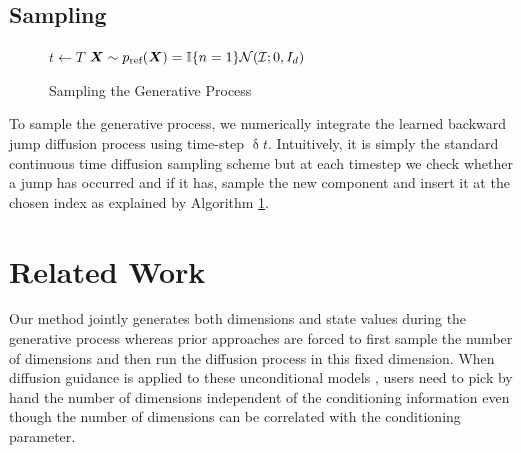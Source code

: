 \subsection{Sampling}

\begin{figure}
    \begin{minipage}[t]{0.6\textwidth}
    \small
        \begin{algorithm}[H]
        \SetAlgoNoLine
        \DontPrintSemicolon
        $t \leftarrow T$\;
        ${\bm{X}} \sim p_{\textup{ref}}({\bm{X}}) = \mathbb{I}\{ n=1\} \mathcal{N}(\mathcal{I}; 0, I_{d})$\;
         \caption{Sampling the Generative Process}
         \label{alg:backwardsampling}
        \end{algorithm}
    \end{minipage}
\end{figure}
To sample the generative process, we numerically integrate the learned backward jump diffusion process using time-step  $\updelta t$. Intuitively, it is simply the standard continuous time diffusion sampling scheme \cite{song2020score} but at each timestep we check whether a jump has occurred and if it has, sample the new component and insert it at the chosen index as explained by Algorithm \ref{alg:backwardsampling}.


\section{Related Work}

Our method jointly generates both dimensions and state values during the generative process whereas prior approaches \cite{hoogeboom2022equivariant, igashov2022equivariant} are forced to first sample the number of dimensions and then run the diffusion process in this fixed dimension. When diffusion guidance is applied to these unconditional models \cite{weiss2023guided, zhang2023towards}, users need to pick by hand the number of dimensions independent of the conditioning information even though the number of dimensions can be correlated with the conditioning parameter.


